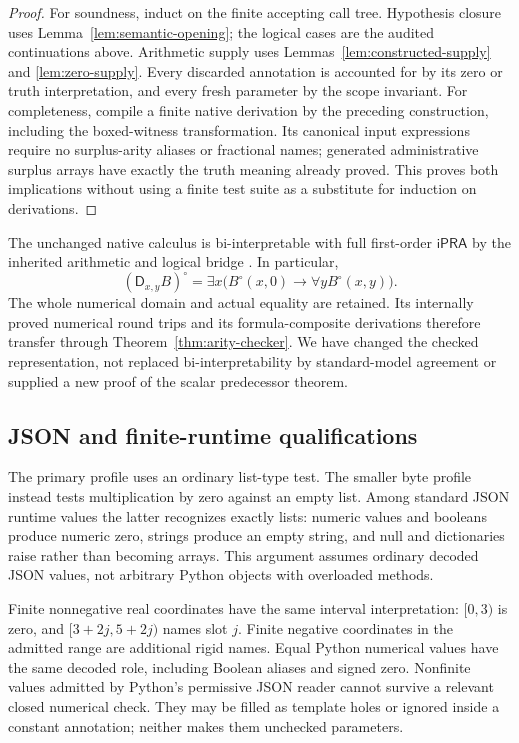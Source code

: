 \documentclass[11pt,letterpaper]{article}
\theoremstyle{definition}\newtheorem{definition}[theorem]{Definition}
\theoremstyle{remark}\newtheorem{remark}[theorem]{Remark}
\newcommand{\ipra}{\mathsf{iPRA}}
\newcommand{\D}{\mathsf D}
\begin{document}
\begin{proof}
For soundness, induct on the finite accepting call tree.  Hypothesis
closure uses Lemma~\ref{lem:semantic-opening}; the logical cases are
the audited continuations above.  Arithmetic supply uses
Lemmas~\ref{lem:constructed-supply} and \ref{lem:zero-supply}.
Every discarded annotation is accounted for by its zero or truth
interpretation, and every fresh parameter by the scope invariant.
For completeness, compile a finite native derivation by the preceding
construction, including the boxed-witness transformation.  Its
canonical input expressions require no surplus-arity aliases or fractional
names; generated administrative surplus arrays have exactly the truth
meaning already proved.  This proves both implications without using a finite test
suite as a substitute for induction on derivations.
\end{proof}

The unchanged native calculus is bi-interpretable with full first-order
$\ipra$ by the inherited arithmetic and logical bridge
\cite{generated,corpus}.  In particular,
\[
 (\D_{x,y}B)^\circ
 =\exists x\bigl(B^\circ(x,0)\to\forall yB^\circ(x,y)\bigr).
\]
The whole numerical domain and actual equality are retained.  Its
internally proved numerical round trips and its formula-composite
derivations therefore transfer through
Theorem~\ref{thm:arity-checker}.  We have changed the checked
representation, not replaced bi-interpretability by standard-model
agreement or supplied a new proof of the scalar predecessor theorem.

\subsection{JSON and finite-runtime qualifications}

The primary profile uses an ordinary list-type test.  The smaller byte
profile instead tests multiplication by zero against an empty list.
Among standard JSON runtime values the latter recognizes exactly lists:
numeric values and booleans produce numeric zero, strings produce an
empty string, and null and dictionaries raise rather than becoming
arrays.  This argument assumes ordinary decoded JSON values, not
arbitrary Python objects with overloaded methods.

Finite nonnegative real coordinates have the same interval
interpretation: $[0,3)$ is zero, and $[3+2j,5+2j)$ names slot $j$.
Finite negative coordinates in the admitted range are additional rigid
names.  Equal Python numerical values have the same decoded role,
including Boolean aliases and signed zero.  Nonfinite values admitted
by Python's permissive JSON reader cannot survive a relevant closed
numerical check.  They may be filled as template holes or ignored
inside a constant annotation; neither makes them unchecked parameters.
\end{document}
